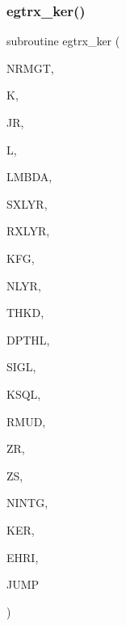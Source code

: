 \subsubsection{\texorpdfstring{egtrx\+\_\+ker()}{egtrx\_ker()}}
{\footnotesize\ttfamily subroutine egtrx\+\_\+ker (\begin{DoxyParamCaption}\item[{integer}]{N\+R\+M\+GT,  }\item[{integer}]{K,  }\item[{integer}]{JR,  }\item[{integer}]{L,  }\item[{real (kind=ql)}]{L\+M\+B\+DA,  }\item[{integer}]{S\+X\+L\+YR,  }\item[{integer}]{R\+X\+L\+YR,  }\item[{integer}]{K\+FG,  }\item[{integer}]{N\+L\+YR,  }\item[{real(kind=ql), dimension (nlyr)}]{T\+H\+KD,  }\item[{real(kind=ql), dimension (nlyr)}]{D\+P\+T\+HL,  }\item[{complex(kind=ql), dimension (nlyr)}]{S\+I\+GL,  }\item[{complex(kind=ql), dimension (nlyr)}]{K\+S\+QL,  }\item[{real (kind=ql), dimension(0\+:nlyr)}]{R\+M\+UD,  }\item[{real (kind=ql)}]{ZR,  }\item[{real (kind=ql)}]{ZS,  }\item[{integer}]{N\+I\+N\+TG,  }\item[{complex (kind=ql), dimension(jnlo-\/nrmgt\+:jnhi,6)}]{K\+ER,  }\item[{complex (kind=ql), dimension(nrmgt,6)}]{E\+H\+RI,  }\item[{logical}]{J\+U\+MP }\end{DoxyParamCaption})}

